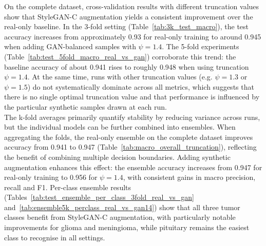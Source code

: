 On the complete dataset, cross-validation results with different truncation values show that StyleGAN-C augmentation yields a consistent improvement over the real-only baseline. In the 3-fold setting (Table~\ref{tab:3k_test_macro}), the test accuracy increases from approximately 0.93 for real-only training to around 0.945 when adding GAN-balanced samples with $\psi = 1.4$. The 5-fold experiments (Table~\ref{tab:test_5fold_macro_real_vs_gan}) corroborate this trend: the baseline accuracy of about 0.941 rises to roughly 0.948 when using truncation $\psi = 1.4$. At the same time, runs with other truncation values (e.g. $\psi = 1.3$ or $\psi = 1.5$) do not systematically dominate across all metrics, which suggests that there is no single optimal truncation value and that performance is influenced by the particular synthetic samples drawn at each run.\\

The k-fold averages primarily quantify stability by reducing variance across runs, but the individual models can be further combined into ensembles. When aggregating the folds, the real-only ensemble on the complete dataset improves accuracy from 0.941 to 0.947 (Table~\ref{tab:macro_overall_truncation}), reflecting the benefit of combining multiple decision boundaries. Adding synthetic augmentation enhances this effect: the ensemble accuracy increases from 0.947 for real-only training to 0.956 for $\psi = 1.4$, with consistent gains in macro precision, recall and F1. Per-class ensemble results (Tables~\ref{tab:test_ensemble_per_class_3fold_real_vs_gan} and~\ref{tab:ensemble5k_perclass_real_vs_gan14}) show that all three tumor classes benefit from StyleGAN-C augmentation, with particularly notable improvements for glioma and meningioma, while pituitary remains the easiest class to recognise in all settings.\\

